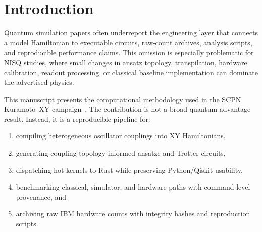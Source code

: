 \documentclass[preprint,aps,physrev,superscriptaddress,floatfix,longbibliography]{revtex4-2}
\begin{document}
\begin{abstract}
Fez/Marrakesh lanes rank \texttt{EfficientSU2} lowest in measured energy.
Additional $n=8$ seed-sensitivity lanes with seed 23 preserve that
larger-width ordering on both backends.
The hardware evidence is therefore a reproducibility and ansatz-sensitivity
check, not a backend-general topology-informed superiority claim. The paper is
methodological rather than a quantum-advantage claim: small-system exact
simulation remains classically tractable, and hardware results are used
to validate compilation, noise budgeting, and experiment reproducibility.
All code, benchmark commands, hardware raw counts, and derived artefacts are public at
\href{https://github.com/anulum/scpn-quantum-control}{\texttt{anulum/scpn-quantum-control}}.
\end{abstract}

\maketitle

\section{Introduction}

Quantum simulation papers often underreport the engineering layer that
connects a model Hamiltonian to executable circuits, raw-count archives,
analysis scripts, and reproducible performance claims. This omission is
especially problematic for NISQ studies, where small changes in ansatz
topology, transpilation, hardware calibration, readout processing, or
classical baseline implementation can dominate the advertised physics.

This manuscript presents the computational methodology used in the SCPN
Kuramoto--XY campaign~\cite{SotekSCPNSoftware}.
The contribution is
not a broad quantum-advantage result. Instead, it is a reproducible
pipeline for:
%
\begin{enumerate}
  \item compiling heterogeneous oscillator couplings into XY Hamiltonians,
  \item generating coupling-topology-informed ansatze and Trotter circuits,
  \item dispatching hot kernels to Rust while preserving Python/Qiskit
        usability,
  \item benchmarking classical, simulator, and hardware paths with
        command-level provenance, and
  \item archiving raw IBM hardware counts with integrity hashes and
        reproduction scripts.
\end{enumerate}
\end{document}
